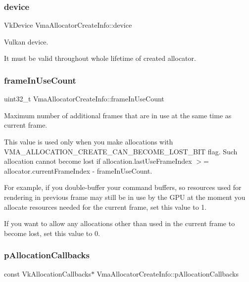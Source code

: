 \subsubsection{\texorpdfstring{device}{device}}
{\footnotesize\ttfamily Vk\+Device Vma\+Allocator\+Create\+Info\+::device}



Vulkan device. 

It must be valid throughout whole lifetime of created allocator. \mbox{\label{structVmaAllocatorCreateInfo_a21ea188dd212b8171cb9ecbed4a2a3a7}} 
\subsubsection{\texorpdfstring{frame\+In\+Use\+Count}{frameInUseCount}}
{\footnotesize\ttfamily uint32\+\_\+t Vma\+Allocator\+Create\+Info\+::frame\+In\+Use\+Count}



Maximum number of additional frames that are in use at the same time as current frame. 

This value is used only when you make allocations with V\+M\+A\+\_\+\+A\+L\+L\+O\+C\+A\+T\+I\+O\+N\+\_\+\+C\+R\+E\+A\+T\+E\+\_\+\+C\+A\+N\+\_\+\+B\+E\+C\+O\+M\+E\+\_\+\+L\+O\+S\+T\+\_\+\+B\+IT flag. Such allocation cannot become lost if allocation.\+last\+Use\+Frame\+Index $>$= allocator.\+current\+Frame\+Index -\/ frame\+In\+Use\+Count.

For example, if you double-\/buffer your command buffers, so resources used for rendering in previous frame may still be in use by the G\+PU at the moment you allocate resources needed for the current frame, set this value to 1.

If you want to allow any allocations other than used in the current frame to become lost, set this value to 0. \mbox{\label{structVmaAllocatorCreateInfo_a6e409087e3be55400d0e4ccbe43c608d}} 
\subsubsection{\texorpdfstring{p\+Allocation\+Callbacks}{pAllocationCallbacks}}
{\footnotesize\ttfamily const Vk\+Allocation\+Callbacks$\ast$ Vma\+Allocator\+Create\+Info\+::p\+Allocation\+Callbacks}



